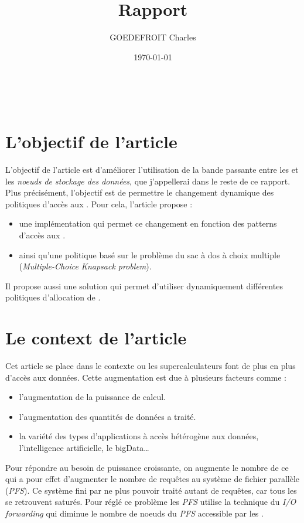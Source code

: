\documentclass[10pt, a4paper]{article}
\title{Rapport}
\author{GOEDEFROIT Charles}
\date{\today}
\begin{document}
\begin{titlepage}
	\centering
  \ {} %
	\vfill
	\vspace{1cm}
	{\scshape\Huge\MyTitle\par}
	\vspace{0.5cm}
	{\Large\MySubject\par}
	\vspace{1cm}
	\MyAuthor
	\vfill
	{\large\MyDate\par}
\end{titlepage}

\newpage

\section{L'objectif de l'article}

L'objectif de l'article est d'améliorer l'utilisation de la bande passante entre les \noeudsDeCalculs{} et les \emph{noeuds de stockage des données}, que j'appellerai \noeudsIO{} dans le reste de ce rapport. Plus précisément, l'objectif est de permettre le changement dynamique des politiques d'accès aux \noeudsIO{}. Pour cela, l'article propose :
\begin{itemize}
  \item une implémentation qui permet ce changement en fonction des patterns d'accès aux \noeudsIO{}.
  \item ainsi qu'une politique basé sur le problème du sac à dos à choix multiple (\emph{Multiple-Choice Knapsack problem}).
\end{itemize}

Il propose aussi une solution qui permet d'utiliser dynamiquement différentes politiques d'allocation de \noeudsIOforwarding{}.

\section{Le context de l'article}

Cet article se place dans le contexte ou les supercalculateurs font de plus en
plus d'accès aux données. Cette augmentation est due à plusieurs facteurs comme :
\begin{itemize}
  \item l'augmentation de la puissance de calcul.
  \item l'augmentation des quantités de données a traité.
  \item la variété des types d'applications à accès hétérogène aux données, l'intelligence artificielle, le bigData\dots
\end{itemize}
Pour répondre au besoin de puissance croissante, on augmente le nombre de \noeudsDeCalculs{} ce qui a pour effet d'augmenter le nombre de requêtes au système de fichier parallèle (\emph{PFS}). Ce système fini par ne plus pouvoir traité autant de requêtes, car tous les \noeudsIO{} se retrouvent saturés. Pour réglé ce problème les \emph{PFS} utilise la technique du \emph{I/O forwarding} qui diminue le nombre de noeuds du \emph{PFS} accessible par les \noeudsDeCalculs{}.
\end{document}
